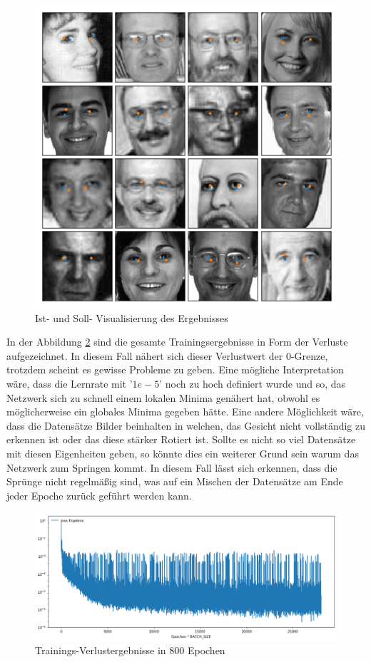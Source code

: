 \begin{figure}
	\centering
	\includegraphics[scale=0.5]{images/epoch-800-full.png}
	\caption{Ist- und Soll- Visualisierung des Ergebnisses}
	\label{fig:resultPic}
\end{figure}
In der Abbildung \ref{fig:lossDiag} sind die gesamte Trainingsergebnisse in Form der Verluste aufgezeichnet. 
In diesem Fall nähert sich dieser Verlustwert der $0$-Grenze, trotzdem scheint es gewisse Probleme zu geben. 
Eine mögliche Interpretation wäre, dass die Lernrate mit '$1e-5$' noch zu hoch definiert wurde und so, das Netzwerk sich zu schnell einem lokalen Minima genähert hat, obwohl es möglicherweise ein globales Minima gegeben hätte. 
Eine andere Möglichkeit wäre, dass die Datensätze Bilder beinhalten in welchen, das Gesicht nicht vollständig zu erkennen ist oder das diese stärker Rotiert ist. 
Sollte es nicht so viel Datensätze mit diesen Eigenheiten geben, so könnte dies ein weiterer Grund sein warum das Netzwerk zum Springen kommt. 
In diesem Fall lässt sich erkennen, dass die Sprünge nicht regelmäßig sind, was auf ein Mischen der Datensätze am Ende jeder Epoche zurück geführt werden kann. 
\begin{figure}
	\centering
	\includegraphics[scale=0.4]{images/loss-diagram-all.png}
	\caption{Trainings-Verlustergebnisse in 800 Epochen}
	\label{fig:lossDiag}
\end{figure}

